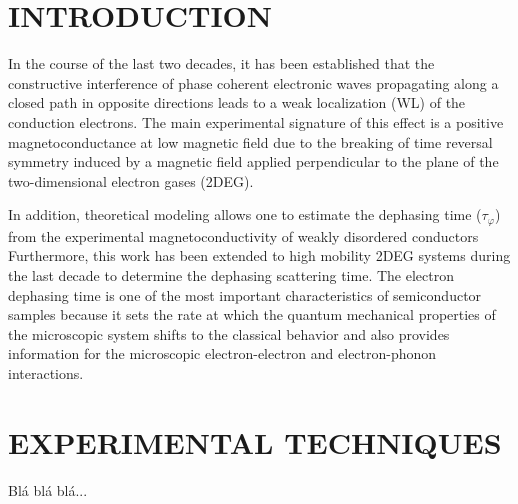 \documentclass[prb,showpacs,showkeys,twocolumn]{revtex4}
\newcommand{\tauphi} {\ensuremath{\tau_\varphi}}
\begin{document}
	
\maketitle

\section{INTRODUCTION}

	In the course of the last two decades, it has been established that the constructive interference of phase coherent electronic waves propagating along a closed path in opposite directions leads to a weak localization (WL) of the conduction electrons. The main experimental signature of this effect is a positive magnetoconductance at low magnetic field due to the breaking of time reversal symmetry induced by a magnetic field applied perpendicular to the plane of the two-dimensional electron gases (2DEG).

	In addition, theoretical modeling allows one to estimate the dephasing time ($\tauphi$) from the experimental magnetoconductivity of weakly disordered conductors\cite{Abrahams:1979,Anderson:1980,Hikami:1980} Furthermore, this work has been extended to high mobility 2DEG systems during the last decade to determine the dephasing scattering time. The electron dephasing time is one of the most important characteristics of semiconductor samples because it sets the rate at which the quantum mechanical properties of the microscopic system shifts to the classical behavior and also provides information for the microscopic electron-electron and electron-phonon interactions.

\section{EXPERIMENTAL TECHNIQUES}

	Blá blá blá...
	
\end{document}
